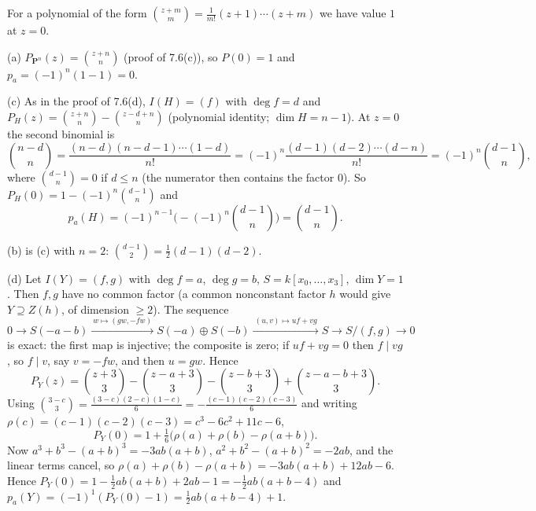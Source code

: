 \documentclass[11pt]{article}
\begin{document}
\pf
For a polynomial of the form $\binom{z+m}{m}=\frac1{m!}(z+1)\cdots(z+m)$ we have value $1$ at $z=0$.

(a) $P_{\mathbf P^n}(z)=\binom{z+n}{n}$ (proof of 7.6(c)), so $P(0)=1$ and $p_a=(-1)^n(1-1)=0$.

(c) As in the proof of 7.6(d), $I(H)=(f)$ with $\deg f=d$ and $P_H(z)=\binom{z+n}{n}-\binom{z-d+n}{n}$ (polynomial identity; $\dim H=n-1$). At $z=0$ the second binomial is
\[
\binom{n-d}{n}=\frac{(n-d)(n-d-1)\cdots(1-d)}{n!}=(-1)^n\frac{(d-1)(d-2)\cdots(d-n)}{n!}=(-1)^n\binom{d-1}{n},
\]
where $\binom{d-1}{n}=0$ if $d\le n$ (the numerator then contains the factor $0$). So $P_H(0)=1-(-1)^n\binom{d-1}n$ and
\[
p_a(H)=(-1)^{n-1}\big(-(-1)^n\binom{d-1}{n}\big)=\binom{d-1}{n}.
\]

(b) is (c) with $n=2$: $\binom{d-1}{2}=\frac12(d-1)(d-2)$.

(d) Let $I(Y)=(f,g)$ with $\deg f=a$, $\deg g=b$, $S=k[x_0,\dots,x_3]$, $\dim Y=1$. Then $f,g$ have no common factor (a common nonconstant factor $h$ would give $Y\supseteq Z(h)$, of dimension $\ge2$). The sequence
\[
0\to S(-a-b)\xrightarrow{\ w\mapsto(gw,-fw)\ }S(-a)\oplus S(-b)\xrightarrow{\ (u,v)\mapsto uf+vg\ }S\to S/(f,g)\to0
\]
is exact: the first map is injective; the composite is zero; if $uf+vg=0$ then $f\mid vg$, so $f\mid v$, say $v=-fw$, and then $u=gw$. Hence
\[
P_Y(z)=\binom{z+3}{3}-\binom{z-a+3}{3}-\binom{z-b+3}{3}+\binom{z-a-b+3}{3}.
\]
Using $\binom{3-c}{3}=\frac{(3-c)(2-c)(1-c)}{6}=-\frac{(c-1)(c-2)(c-3)}{6}$ and writing $\rho(c)=(c-1)(c-2)(c-3)=c^3-6c^2+11c-6$,
\[
P_Y(0)=1+\tfrac16\big(\rho(a)+\rho(b)-\rho(a+b)\big).
\]
Now $a^3+b^3-(a+b)^3=-3ab(a+b)$, $a^2+b^2-(a+b)^2=-2ab$, and the linear terms cancel, so $\rho(a)+\rho(b)-\rho(a+b)=-3ab(a+b)+12ab-6$. Hence $P_Y(0)=1-\frac12ab(a+b)+2ab-1=-\frac12ab(a+b-4)$ and $p_a(Y)=(-1)^1(P_Y(0)-1)=\frac12ab(a+b-4)+1$.
\end{document}
